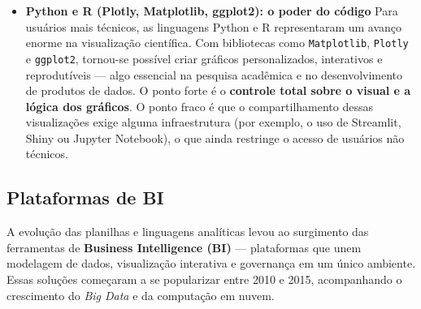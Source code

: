 \begin{itemize}[leftmargin=*]
  \item \textbf{Python e R (Plotly, Matplotlib, ggplot2): o poder do código}  
  Para usuários mais técnicos, as linguagens Python e R representaram um avanço enorme na visualização científica.  
  Com bibliotecas como \texttt{Matplotlib}, \texttt{Plotly} e \texttt{ggplot2}, tornou-se possível criar gráficos personalizados, interativos e reprodutíveis — algo essencial na pesquisa acadêmica e no desenvolvimento de produtos de dados.  
  O ponto forte é o \textbf{controle total sobre o visual e a lógica dos gráficos}. O ponto fraco é que o compartilhamento dessas visualizações exige alguma infraestrutura (por exemplo, o uso de Streamlit, Shiny ou Jupyter Notebook), o que ainda restringe o acesso de usuários não técnicos.
\end{itemize}

\subsection*{Plataformas de BI}

A evolução das planilhas e linguagens analíticas levou ao surgimento das ferramentas de \textbf{Business Intelligence (BI)} — plataformas que unem modelagem de dados, visualização interativa e governança em um único ambiente. Essas soluções começaram a se popularizar entre 2010 e 2015, acompanhando o crescimento do \textit{Big Data} e da computação em nuvem.

